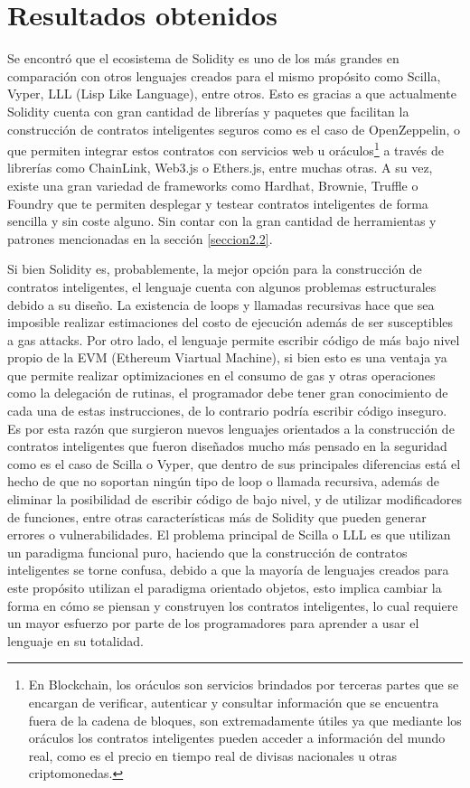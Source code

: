 \documentclass[a4paper,10pt]{article}
\begin{document}
	\section{Resultados obtenidos}
	Se encontró que el ecosistema de Solidity es uno de los más grandes en comparación con otros lenguajes creados para el mismo propósito como Scilla, Vyper, LLL (Lisp Like Language), entre otros. Esto es gracias a que actualmente Solidity cuenta con gran cantidad de librerías y paquetes que facilitan la construcción de contratos inteligentes seguros como es el caso de OpenZeppelin, o que permiten integrar estos contratos con servicios web u oráculos\footnote{En Blockchain, los oráculos son servicios brindados por terceras partes que se encargan de verificar, autenticar y consultar información que se encuentra fuera de la cadena de bloques, son extremadamente útiles ya que mediante los oráculos los contratos inteligentes pueden acceder a información del mundo real, como es el precio en tiempo real de divisas nacionales u otras criptomonedas.} a través de librerías como ChainLink, Web3.js o Ethers.js, entre muchas otras. A su vez, existe una gran variedad de frameworks como Hardhat, Brownie, Truffle o Foundry que te permiten desplegar y testear contratos inteligentes de forma sencilla y sin coste alguno. Sin contar con la gran cantidad de herramientas y patrones mencionadas en la sección \ref{seccion2.2}.
	
	Si bien Solidity es, probablemente, la mejor opción para la construcción de contratos inteligentes, el lenguaje cuenta con algunos problemas estructurales debido a su diseño. La existencia de loops y llamadas recursivas hace que sea imposible realizar estimaciones del costo de ejecución además de ser susceptibles a gas attacks. Por otro lado, el lenguaje permite escribir código de más bajo nivel propio de la EVM (Ethereum Viartual Machine), si bien esto es una ventaja ya que permite realizar optimizaciones en el consumo de gas y otras operaciones como la delegación de rutinas, el programador debe tener gran conocimiento de cada una de estas instrucciones, de lo contrario podría escribir código inseguro. Es por esta razón que surgieron nuevos lenguajes orientados a la construcción de contratos inteligentes que fueron diseñados mucho más pensado en la seguridad como es el caso de Scilla o Vyper, que dentro de sus principales diferencias está el hecho de que no soportan ningún tipo de loop o llamada recursiva, además de eliminar la posibilidad de escribir código de bajo nivel, y de utilizar modificadores de funciones, entre otras características más de Solidity que pueden generar errores o vulnerabilidades. El problema principal de Scilla o LLL es que utilizan un paradigma funcional puro, haciendo que la construcción de contratos inteligentes se torne confusa, debido a que la mayoría de lenguajes creados para este propósito utilizan el paradigma orientado objetos, esto implica cambiar la forma en cómo se piensan y construyen los contratos inteligentes, lo cual requiere un mayor esfuerzo por parte de los programadores para aprender a usar el lenguaje en su totalidad.
	
\end{document}
